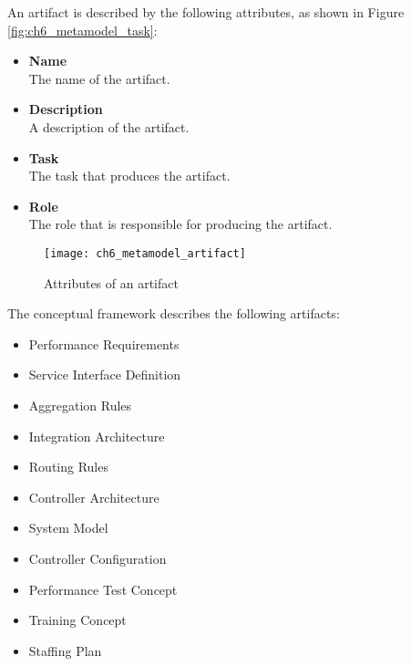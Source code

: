 An artifact is described by the following attributes, as shown in Figure \ref{fig:ch6_metamodel_task}:
\begin{itemize}
	\item \textbf{Name}\\
	The name of the artifact.
	\item \textbf{Description}\\
	A description of the artifact.
	\item \textbf{Task}\\
	The task that produces the artifact.
	\item \textbf{Role}\\
	The role that is responsible for producing the artifact.
\end{itemize}

\begin{figure}[htpb] \centering 
	\texttt{[image: ch6\_metamodel\_artifact]} 
	\caption{Attributes of an artifact} 
	\label{fig:ch6_metamodel_artifact} 
\end{figure}

The conceptual framework describes the following artifacts:

\begin{itemize}
	\item Performance Requirements
	\item Service Interface Definition
	\item Aggregation Rules
	\item Integration Architecture
	\item Routing Rules
	\item Controller Architecture
	\item System Model
	\item Controller Configuration
	\item Performance Test Concept
	\item Training Concept
	\item Staffing Plan
\end{itemize}

